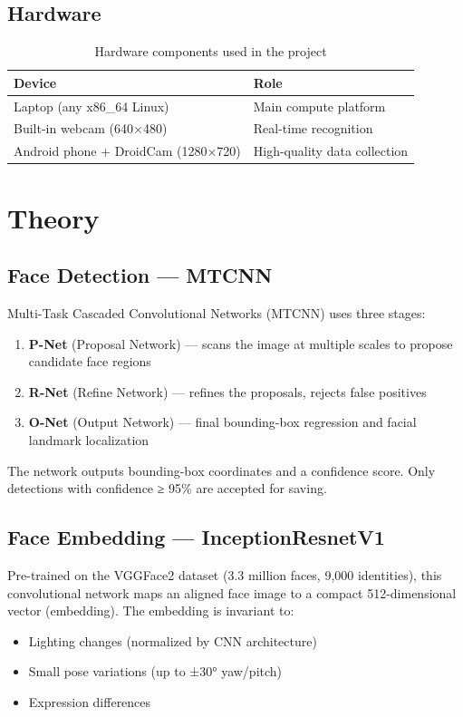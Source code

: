 \documentclass[12pt,a4paper]{article}
\begin{document}
\subsection*{Hardware}
\begin{table}[H]
\centering
\begin{tabular}{ll}
\toprule
\textbf{Device} & \textbf{Role} \\
\midrule
Laptop (any x86\_64 Linux) & Main compute platform \\
Built-in webcam (640×480) & Real-time recognition \\
Android phone + DroidCam (1280×720) & High-quality data collection \\
\bottomrule
\end{tabular}
\caption{Hardware components used in the project}
\end{table}

\section{Theory}

\subsection{Face Detection --- MTCNN}

Multi-Task Cascaded Convolutional Networks (MTCNN) uses three stages:

\begin{enumerate}
    \item \textbf{P-Net} (Proposal Network) --- scans the image at multiple scales to propose candidate face regions
    \item \textbf{R-Net} (Refine Network) --- refines the proposals, rejects false positives
    \item \textbf{O-Net} (Output Network) --- final bounding-box regression and facial landmark localization
\end{enumerate}

The network outputs bounding-box coordinates and a confidence score. Only detections with confidence ≥ 95\% are accepted for saving.

\subsection{Face Embedding --- InceptionResnetV1}

Pre-trained on the VGGFace2 dataset (3.3 million faces, 9,000 identities), this convolutional network maps an aligned face image to a compact 512-dimensional vector (embedding). The embedding is invariant to:
\begin{itemize}
    \item Lighting changes (normalized by CNN architecture)
    \item Small pose variations (up to ±30° yaw/pitch)
    \item Expression differences
\end{itemize}
\end{document}
